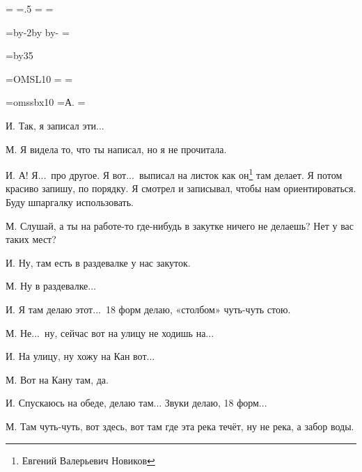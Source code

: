 \pdfpagewidth=297mm
\pdfpageheight=210mm
\pdfhorigin=1in
\pdfvorigin=0pt

\shhtotal=\pdfpagewidth
\htotal=.5\shhtotal
\vtotal=\pdfpageheight
\shoutline=0pt
\shstaplewidth=0pt
\shcrop=0pt
\shfootline={}
\shthickness=0pt %

\horigin=9mm
\hoffset=-9mm
\hsize=\htotal \advance\hsize by-2\horigin \advance\hsize by\hoffset
\advance\horigin by-\hoffset
\output={\ifodd\pageno\hoffset=0pt\fi \plainoutput}

\vorigin=15mm
\vsize=\topskip \advance\vsize by35\baselineskip

\font\TENSL=OMSL10
\headline={\line{\hrulefill}}
\footline={\line{\hss\tenrm\folio\hss}}

\font\speakerF=omssbx10
\def\I{\item{\speakerF И.}}
\def\M{\item{\speakerF М.}}
=\hbox{\speakerF А.\enskip}
\parindent=


\I
Так, я записал эти...

\M
Я видела то, что ты написал, но я не прочитала.

\I
А! Я...\ про другое. Я вот...\ выписал на листок как он\footnote*{Евгений Валерьевич Новиков} там делает.
Я потом красиво запишу, по порядку.
Я смотрел и записывал, чтобы нам ориентироваться.
Буду шпаргалку использовать.

\M
Слушай, а ты на работе-то где-нибудь в закутке ничего не делаешь?
Нет у вас таких мест?

\I
Ну, там есть в раздевалке у нас закуток.

\M
Ну в раздевалке...

\I
Я там делаю этот...\
18 форм делаю, «столбом» чуть-чуть стою.

\M
Не...\ ну, сейчас вот на улицу не ходишь на...

\I
На улицу, ну хожу на Кан вот...

\M
Вот на Кану там, да.

\I
Спускаюсь на обеде, делаю там...
Звуки делаю, 18 форм...

\M
Там чуть-чуть, вот здесь, вот там где эта река течёт, ну не река, а забор воды.

